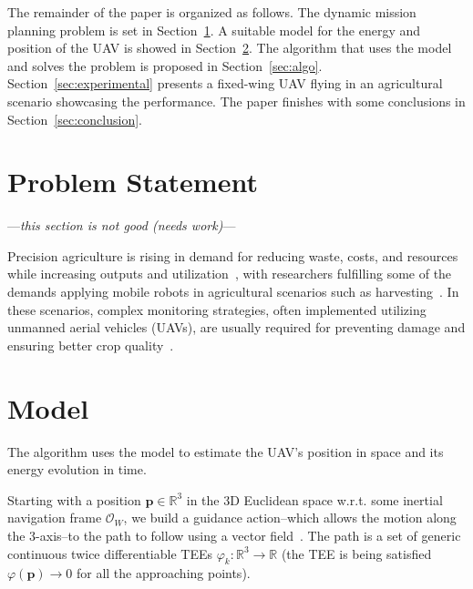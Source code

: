\documentclass[letterpaper,10pt,conference]{ieeeconf}
\begin{document}
The remainder of the paper is organized as follows. The dynamic mission planning problem is set in Section~\ref{sec:prob}. A suitable model for the energy and position of the UAV is showed in Section~\ref{sec:model}. The algorithm that uses the model and solves the problem is proposed in Section~\ref{sec:algo}. Section~\ref{sec:experimental} presents a fixed-wing UAV flying in an agricultural scenario showcasing the performance. The paper finishes with some conclusions in Section~\ref{sec:conclusion}.


\section{Problem Statement}
\label{sec:prob}

\begin{center}\vspace{.2cm}---\emph{this section is not good (needs work)}---\vspace{.6cm}\end{center}

Precision agriculture is rising in demand for reducing waste, costs, and resources while increasing outputs and utilization~\cite{hajjaj2014review}, with researchers fulfilling some of the demands applying mobile robots in agricultural scenarios such as harvesting~\cite{qingchun2012study,dong2011development, de2011design, aljanobi2010setup, li2008analysis, edan2000robotic}. In these scenarios, complex monitoring strategies, often implemented utilizing unmanned aerial vehicles (UAVs), are usually required for preventing damage and ensuring better crop quality~\cite{puri2017agriculture}. 


\section{Model}
\label{sec:model}

The algorithm uses the model to estimate the UAV's position in space and its energy evolution in time.

Starting with a position $\mathbf{p}\in\mathbb{R}^3$ in the 3D Euclidean space w.r.t. some inertial navigation frame $\mathcal{O}_W$, we build a guidance action--which allows the motion along the 3-axis--to the path to follow using a vector field~\cite{de2017guidance}. The path is a set of generic continuous twice differentiable TEEs $\varphi_k:\mathbb{R}^3\rightarrow\mathbb{R}$ (the TEE is being satisfied $\varphi(\mathbf{p})\rightarrow 0$ for all the approaching points).
\end{document}
